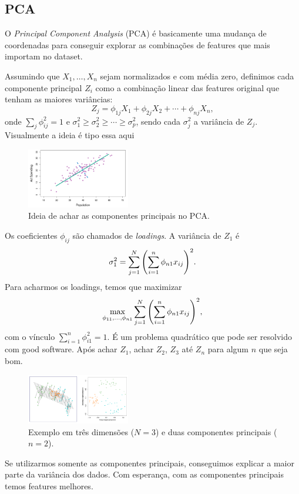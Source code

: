 \documentclass[a4paper,fleqn,12pt]{article}
\begin{document}
\subsection{PCA}

O \textit{Principal Component Analysis} (PCA) é basicamente uma mudança de coordenadas para conseguir explorar as combinações de features que mais importam no dataset.

Assumindo que $X_1, \ldots, X_n$ sejam normalizados e com média zero, definimos cada componente principal $Z_i$ como a combinação linear das features original que tenham as maiores variâncias:
$$
Z_j = \phi_{1j} X_1 + \phi_{2j} X_2 + \cdots + \phi_{nj} X_n,
$$
onde $\sum_j \phi_{ij}^2 = 1$ e $\sigma_1^2 \geq \sigma_{2}^2 \geq \cdots \geq \sigma_p^2$, sendo cada $\sigma_j^2$ a variância de $Z_j$. Visualmente a ideia é tipo essa aqui
\begin{figure}[H]
\centering
\includegraphics[width=0.4\textwidth]{fig/pca_variables.png}
\caption{Ideia de achar as componentes principais no PCA.}
\label{fig:pca_variables}
\end{figure}

Os coeficientes $\phi_{ij}$ são chamados de \textit{loadings}. A variância de $Z_1$ é
$$
\sigma_1^2 = \sum_{j=1}^{N} \qty( \sum_{i=1}^{n} \phi_{n1} x_{ij} )^2.
$$
Para acharmos os loadings, temos que maximizar
$$
\max_{\phi_{11}, \ldots, \phi_{n1}} \sum_{j=1}^{N} \qty( \sum_{i=1}^{n} \phi_{n1} x_{ij} )^2,
$$
com o vínculo $\sum_{i=1}^{n} \phi_{i1}^2 = 1$. É um problema quadrático que pode ser resolvido com good software. Após achar $Z_1$, achar $Z_2$, $Z_3$ até $Z_n$ para algum $n$ que seja bom.
\begin{figure}[H]
\centering
\includegraphics[width=0.4\textwidth]{fig/example_3d.png}
\caption{Exemplo em três dimensões ($N = 3$) e duas componentes principais ($n=2$).}
\label{fig:example_3d}
\end{figure}
Se utilizarmos somente as componentes principais, conseguimos explicar a maior parte da variância dos dados. Com esperança, com as componentes principais temos features melhores.
\end{document}
